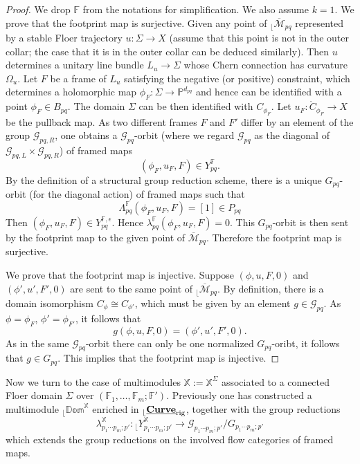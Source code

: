 \documentclass[reqno, 10pt]{amsart}
\numberwithin{equation}{section}
\numberwithin{equation}{section}
\theoremstyle{definition}
\theoremstyle{remark}
\newcommand{\beqn}{\begin{equation*}}
\newcommand{\eeqn}{\end{equation*}}
\newcommand{\ov}{\overline}
\newcommand{\mb}{\mathbb}
\newcommand{\mc}{\mathcal}
\renewcommand{\outer}{{}_{\lfloor}}
\newcommand{\uds}[1]{\underline{\smash{#1}}}
\begin{document}
\begin{proof}
We drop ${\mb F}$ from the notations for simplification. We also assume $k=1$. We prove that the footprint map is surjective. Given any point of $\outer \ov{\mc M}_{pq}$ represented by a stable Floer trajectory $u: \Sigma \to X$ (assume that this point is not in the outer collar; the case that it is in the outer collar can be deduced similarly). Then $u$ determines a unitary line bundle $L_u  \to \Sigma$ whose Chern connection has curvature $\Omega_u$. Let $F$ be a frame of $L_u$ satisfying the negative (or positive) constraint, which determines a holomorphic map $\phi_F: \Sigma \to {\mb P}^{d_{pq}}$ and hence can be identified with a point $\phi_F \in B_{pq}$. The domain $\Sigma$ can be then identified with $C_{\phi_F}$. Let $u_F: \mathring C_{\phi_F} \to X$ be the pullback map. As two different frames $F$ and $F'$ differ by an element of the group ${\mc G}_{pq, R}$, one obtains a ${\mc G}_{pq}$-orbit (where we regard ${\mc G}_{pq}$ as the diagonal of ${\mc G}_{pq, L} \times {\mc G}_{pq, R}$) of framed maps 
\beqn
( \phi_F, u_F, F) \in Y_{pq}^{\mb F}.
\eeqn
By the definition of a structural group reduction scheme, there is a unique $G_{pq}$-orbit (for the diagonal action) of framed maps such that 
\beqn
\Lambda_{pq}^{\mb F}(\phi_F, u_F, F) = [1] \in P_{pq}
\eeqn
Then $(\phi_F, u_F, F) \in Y_{pq}^{\mb{F}, \epsilon}$. Hence $\lambda_{pq}^{\mb F}(\phi_F, u_F, F) = 0$. This $G_{pq}$-orbit is then sent by the footprint map to the given point of $\ov{\mc M}_{pq}$. Therefore the footprint map is surjective.

We prove that the footprint map is injective. Suppose $(\phi, u, F, 0)$ and $(\phi', u', F', 0)$ are sent to the same point of $\outer \ov{\mc M}_{pq}$. By definition, there is a domain isomorphism $C_\phi \cong C_{\phi'}$, which must be given by an element $g \in {\mc G}_{pq}$. As $\phi = \phi_F$, $\phi' = \phi_{F'}$, it follows that 
\beqn
g (\phi, u, F, 0) = (\phi', u', F',0).
\eeqn
As in the same ${\mc G}_{pq}$-orbit there can only be one normalized $G_{pq}$-oribt, it follows that $g \in G_{pq}$. This implies that the footprint map is injective.
\end{proof}





Now we turn to the case of multimodules ${\mb X}:= \mb{X}^\Sigma$ associated to a connected Floer domain $\Sigma$ over $({\mb F}_1, \ldots, {\mb F}_m; {\mb F}')$. Previously one has constructed a multimodule $\outer{\mb{Dom}}^{\mb X}$ enriched in $\outer\uds{\bf Curve}_{\rm rig}$, together with the group reductions
\beqn
\lambda_{p_1 \cdots p_m; p'}^{\mb X}: \outer Y_{p_1 \cdots p_m; p'}^{{\mb X}} \to {\mc G}_{p_1\cdots p_m; p'}/ G_{p_1 \cdots p_m; p'}
\eeqn
which extends the group reductions on the involved flow categories of framed maps.
\end{document}
